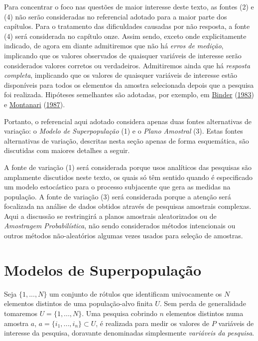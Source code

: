 \documentclass[
  12pt,
  brazilian,
]{book}
\theoremstyle{definition}
\theoremstyle{definition}
\theoremstyle{definition}
\theoremstyle{definition}
\theoremstyle{remark}
\begin{document}
Para concentrar o foco nas questões de maior interesse deste texto, as fontes
(2) e (4) não serão consideradas no referencial adotado para a maior parte dos
capítulos. Para o tratamento das dificuldades causadas por não resposta, a fonte
(4) será considerada no capítulo onze. Assim sendo, exceto onde explicitamente
indicado, de agora em diante admitiremos que não há \emph{erros de medição},
implicando que os valores observados de quaisquer variáveis de interesse serão
considerados valores corretos ou verdadeiros. Admitiremos ainda que há \emph{resposta
completa}, implicando que os valores de quaisquer variáveis de interesse estão
disponíveis para todos os elementos da amostra selecionada depois que a pesquisa
foi realizada. Hipóteses semelhantes são adotadas, por exemplo, em \protect\hyperlink{ref-binder83}{Binder} (\protect\hyperlink{ref-binder83}{1983}) e
\protect\hyperlink{ref-Mont87}{Montanari} (\protect\hyperlink{ref-Mont87}{1987}).

Portanto, o referencial aqui adotado considera apenas duas fontes alternativas
de variação: o \emph{Modelo de Superpopulação} (1) e o \emph{Plano Amostral} (3). Estas
fontes alternativas de variação, descritas nesta seção apenas de forma
esquemática, são discutidas com maiores detalhes a seguir.

A fonte de variação (1) será considerada porque usos analíticos das pesquisas
são amplamente discutidos neste texto, os quais só têm sentido quando é
especificado um modelo estocástico para o processo subjacente que gera as
medidas na população. A fonte de variação (3) será considerada porque a atenção
será focalizada na análise de dados obtidos através de pesquisas amostrais
complexas. Aqui a discussão se restringirá a planos amostrais aleatorizados ou
de \emph{Amostragem Probabilística}, não sendo considerados métodos intencionais ou
outros métodos não-aleatórios algumas vezes usados para seleção de amostras.

\hypertarget{modelos-de-superpopulauxe7uxe3o}{%
\section{Modelos de Superpopulação}\label{modelos-de-superpopulauxe7uxe3o}}

Seja \(\{1, ..., N\}\) um conjunto de rótulos que identificam univocamente os \(N\)
elementos distintos de uma população-alvo finita \(U\). Sem perda de generalidade
tomaremos \(U=\{1,...,N\}\). Uma pesquisa cobrindo \(n\) elementos distintos numa
amostra \(a\), \(a=\{i_{1},...,i_{n}\}\subset U\), é realizada para medir os valores
de \(P\) variáveis de interesse da pesquisa, doravante denominadas simplesmente
\emph{variáveis da pesquisa}.
\end{document}
